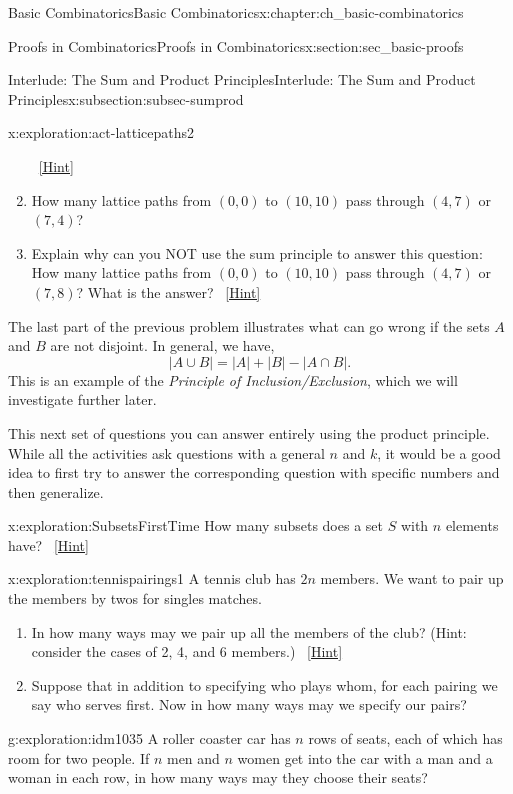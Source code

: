 \documentclass[oneside,10pt,]{book}
\numberwithin{equation}{chapter}
\newcommand{\card}[1]{\left| #1 \right|}
\begin{document}
\begin{chapterptx}{Basic Combinatorics}{}{Basic Combinatorics}{}{}{x:chapter:ch_basic-combinatorics}
\begin{sectionptx}{Proofs in Combinatorics}{}{Proofs in Combinatorics}{}{}{x:section:sec_basic-proofs}
\begin{subsectionptx}{Interlude: The Sum and Product Principles}{}{Interlude: The Sum and Product Principles}{}{}{x:subsection:subsec-sumprod}
\begin{exploration}{}{x:exploration:act-latticepaths2}
\begin{enumerate}[font=\bfseries,label=(\alph*),ref=\alph*]
\qquad~\hfill{\tiny\hyperlink{g:hint:idm972-back}{[Hint]}}\item{}How many lattice paths from \((0,0)\) to \((10,10)\) pass through \((4,7)\) or \((7,4)\)?%
\item{}Explain why can you NOT use the sum principle to answer this question: How many lattice paths from \((0,0)\) to \((10,10)\) pass through \((4,7)\) or \((7,8)\)?  What is the answer?%
\qquad~\hfill{\tiny\hyperlink{g:hint:idm990-back}{[Hint]}}\end{enumerate}
\end{exploration}
The last part of the previous problem illustrates what can go wrong if the sets \(A\) and \(B\) are not disjoint.  In general, we have,%
\begin{equation*}
\card{A \cup B} = \card{A} + \card{B} - \card{A \cap B}.
\end{equation*}
This is an example of the \emph{Principle of Inclusion\slash{}Exclusion}, which we will investigate further later.%
\par
This next set of questions you can answer entirely using the product principle.  While all the activities ask questions with a general \(n\) and \(k\), it would be a good idea to first try to answer the corresponding question with specific numbers and then generalize.%
\begin{exploration}{}{x:exploration:SubsetsFirstTime}%
How many subsets does a set \(S\) with \(n\) elements have?%
\qquad~\hfill{\tiny\hyperlink{g:hint:idm1006-back}{[Hint]}}\end{exploration}
\begin{exploration}{}{x:exploration:tennispairings1}%
A tennis club has \(2n\) members. We want to pair up the members by twos for singles matches.%
\begin{enumerate}[font=\bfseries,label=(\alph*),ref=\alph*]
\item{}In how many ways may we pair up all the members of the club? (Hint: consider the cases of 2, 4, and 6 members.)%
\qquad~\hfill{\tiny\hyperlink{g:hint:idm1023-back}{[Hint]}}\item{}Suppose that in addition to specifying who plays whom, for each pairing we say who serves first.  Now in how many ways may we specify our pairs?%
\end{enumerate}
\end{exploration}
\begin{exploration}{}{g:exploration:idm1035}%
A roller coaster car has \(n\) rows of seats, each of which has room for two people. If \(n\) men and \(n\) women get into the car with a man and a woman in each row, in how many ways may they choose their seats?%

\end{exploration}
\end{subsectionptx}
\end{sectionptx}
\end{chapterptx}
\end{document}
